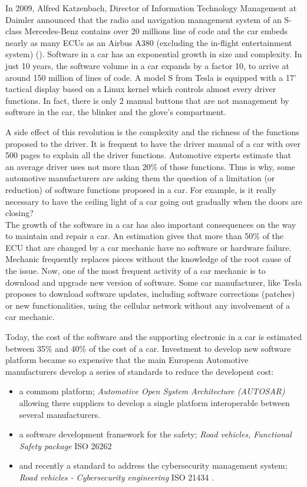 In 2009, Alfred Katzenbach, Director of Information Technology Management at Daimler announced that the radio and navigation management system of an S-class Mercedes-Benz contains over 20 millions line of code and the car embeds nearly as many ECUs as an Airbus A380 (excluding the in-flight entertainment system) (\cite{Cha2009}). Software in a car has an exponential growth in size and complexity. In just 10 years, the software volume in a car expands by a factor 10, to arrive at around 150 million of lines of code. A model S from Tesla is equipped with a 17' tactical display based on a Linux kernel which controls almost every driver functions. In fact, there is only 2 manual buttons that are not management by software in the car, the blinker and the glove's compartment.


A side effect of this revolution is the complexity and the richness of the functions proposed to the driver. It is frequent to have the driver manual of a car with over 500 pages to explain all the driver functions. Automotive experts estimate that an average driver uses not more than 20\% of those functions. Thus is why, some automotive manufacturers are asking them the question of a limitation (or reduction) of software functions proposed in a car. For example, is it really necessary to have the ceiling light of a car going out gradually when the doors are closing?\\

The growth of the software in a car has also important consequences on the way to maintain and repair a car. An estimation gives that more than 50\% of the ECU that are changed by a car mechanic have no software or hardware failure. Mechanic frequently replaces pieces without the knowledge of the root cause of the issue. Now, one of the most frequent activity of a car mechanic is to download and upgrade new version of software. Some car manufacturer, like Tesla proposes to download software updates, including software corrections (patches) or new functionalities, using the cellular network without any involvement of a car mechanic.


Today, the cost of the software and the supporting electronic in a car is estimated between 35\% and 40\% of the cost of a car. Investment to develop new software platform became so expensive that the main European Automotive manufacturers develop a series of standards to reduce the developent cost:
\begin{itemize}
    \item a commom platform; \emph{Automotive Open System Architecture (AUTOSAR)} \cite{AUTOSAR} allowing there suppliers to develop a single platform interoperable between several manufacturers. 
    \item a software development framework for the safety; \emph{Road vehicles, Functional Safety package} ISO 26262 \cite{ISO26262}
    \item and recently a standard to address the cybersecurity management system; \emph{Road vehicles - Cybersecurity engineering} ISO 21434 \cite{ISO21434}.
\end{itemize}

